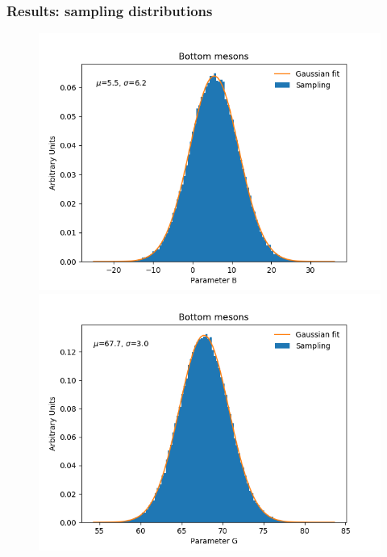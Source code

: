 \documentclass[10pt]{beamer}
\begin{document}
\begin{frame}
\frametitle{Results: sampling distributions}
\begin{figure}
   \includegraphics[scale=0.325]{./Plots/Bottom_bootstrap_b.png}
   \includegraphics[scale=0.325]{./Plots/Bottom_bootstrap_g.png}       
\end{figure}

\end{frame}
\end{document}
